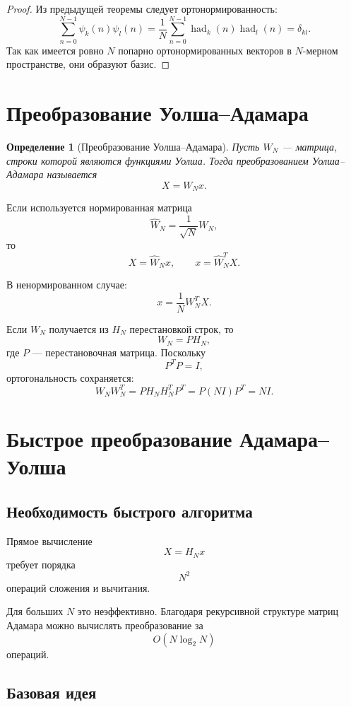 \documentclass[12pt,a4paper]{article}
\newtheorem{definition}{Определение}
\begin{document}
\begin{proof}
Из предыдущей теоремы следует ортонормированность:
\[
    \sum_{n=0}^{N-1}\psi_k(n)\psi_l(n)
    =
    \frac{1}{N}
    \sum_{n=0}^{N-1}\operatorname{had}_k(n)\operatorname{had}_l(n)
    =
    \delta_{kl}.
\]
Так как имеется ровно $N$ попарно ортонормированных векторов в $N$-мерном пространстве, они образуют базис.
\end{proof}

\section{Преобразование Уолша--Адамара}

\begin{definition}[Преобразование Уолша--Адамара]
Пусть $W_N$ --- матрица, строки которой являются функциями Уолша. Тогда преобразованием Уолша--Адамара называется
\[
    X = W_N x.
\]
\end{definition}

Если используется нормированная матрица
\[
    \widehat{W}_N=\frac{1}{\sqrt{N}}W_N,
\]
то
\[
    X=\widehat{W}_N x,
\qquad
    x=\widehat{W}_N^T X.
\]

В ненормированном случае:
\[
    x=\frac{1}{N}W_N^T X.
\]

Если $W_N$ получается из $H_N$ перестановкой строк, то
\[
    W_N = P H_N,
\]
где $P$ --- перестановочная матрица. Поскольку
\[
    P^TP=I,
\]
ортогональность сохраняется:
\[
    W_NW_N^T
    =
    P H_N H_N^T P^T
    =
    P(NI)P^T
    =
    N I.
\]

\section{Быстрое преобразование Адамара--Уолша}

\subsection{Необходимость быстрого алгоритма}

Прямое вычисление
\[
    X=H_Nx
\]
требует порядка
\[
    N^2
\]
операций сложения и вычитания.

Для больших $N$ это неэффективно. Благодаря рекурсивной структуре матриц Адамара можно вычислять преобразование за
\[
    O(N\log_2 N)
\]
операций.

\subsection{Базовая идея}
\end{document}

